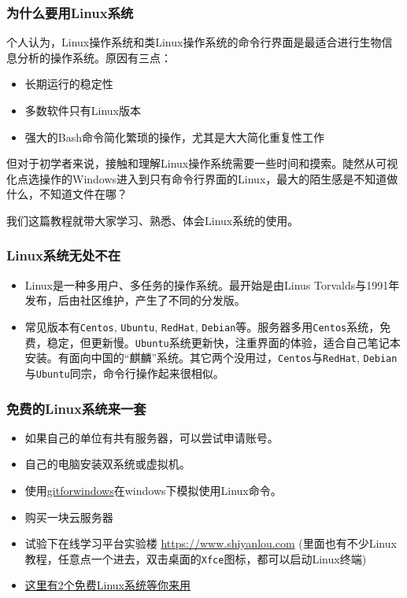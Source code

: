 \documentclass[]{article}
\providecommand{\tightlist}{%
  \setlength{\itemsep}{0pt}\setlength{\parskip}{0pt}}
\numberwithin{figure}{section}
\numberwithin{table}{section}
\begin{document}
\hypertarget{why_linux}{%
\subsubsection{为什么要用Linux系统}\label{why_linux}}

个人认为，Linux操作系统和类Linux操作系统的命令行界面是最适合进行生物信息分析的操作系统。原因有三点：

\begin{itemize}
\tightlist
\item
  长期运行的稳定性
\item
  多数软件只有Linux版本
\item
  强大的Bash命令简化繁琐的操作，尤其是大大简化重复性工作
\end{itemize}

但对于初学者来说，接触和理解Linux操作系统需要一些时间和摸索。陡然从可视化点选操作的Windows进入到只有命令行界面的Linux，最大的陌生感是不知道做什么，不知道文件在哪？

我们这篇教程就带大家学习、熟悉、体会Linux系统的使用。

\hypertarget{linux_everywhere}{%
\subsubsection{Linux系统无处不在}\label{linux_everywhere}}

\begin{itemize}
\item
  Linux是一种多用户、多任务的操作系统。最开始是由Linus Torvalds与1991年发布，后由社区维护，产生了不同的分发版。
\item
  常见版本有\texttt{Centos}, \texttt{Ubuntu}, \texttt{RedHat}, \texttt{Debian}等。服务器多用\texttt{Centos}系统，免费，稳定，但更新慢。\texttt{Ubuntu}系统更新快，注重界面的体验，适合自己笔记本安装。有面向中国的``麒麟''系统。其它两个没用过，\texttt{Centos}与\texttt{RedHat}, \texttt{Debian}与\texttt{Ubuntu}同宗，命令行操作起来很相似。
\end{itemize}

\hypertarget{free_linux}{%
\subsubsection{免费的Linux系统来一套}\label{free_linux}}

\begin{itemize}
\tightlist
\item
  如果自己的单位有共有服务器，可以尝试申请账号。
\item
  自己的电脑安装双系统或虚拟机。
\item
  使用\href{http://blog.csdn.net/woodcorpse/article/details/79313846}{gitforwindows}在windows下模拟使用Linux命令。
\item
  购买一块云服务器
\item
  试验下在线学习平台实验楼 \url{https://www.shiyanlou.com} (里面也有不少Linux教程，任意点一个进去，双击桌面的\texttt{Xfce}图标，都可以启动Linux终端)
\item
  \href{https://mp.weixin.qq.com/s/rXjQfyEX2FnuW9HTM_Uc8Q}{这里有2个免费Linux系统等你来用}
\end{itemize}
\end{document}
